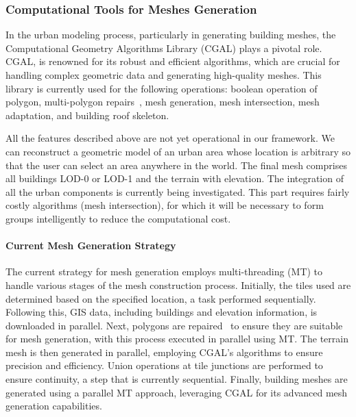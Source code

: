 \documentclass[runningheads]{llncs}
\begin{document}
\subsubsection{Computational Tools for Meshes Generation}

In the urban modeling process, particularly in generating building meshes, the Computational Geometry Algorithms Library (CGAL) plays a pivotal role. CGAL, \cite{the_cgal_project_cgal_2024} is renowned for its robust and efficient algorithms, which are crucial for handling complex geometric data and generating high-quality meshes. This library is currently used for the following operations: boolean operation of polygon, multi-polygon repairs~\cite{loriot_polygon_2024}, mesh generation, mesh intersection, mesh adaptation, and building roof skeleton.

All the features described above are not yet operational in our framework. We can reconstruct a geometric model of an urban area whose location is arbitrary so that the user can select an area anywhere in the world. The final mesh comprises all buildings LOD-0 or LOD-1 and the terrain with elevation. The integration of all the urban components is currently being investigated. This part requires fairly costly algorithms (mesh intersection), for which it will be necessary to form groups intelligently to reduce the computational cost.

\paragraph{Current Mesh Generation Strategy}
The current strategy for mesh generation employs multi-threading (MT) to handle various stages of the mesh construction process. Initially, the tiles used are determined based on the specified location, a task performed sequentially. Following this, GIS data, including buildings and elevation information, is downloaded in parallel. Next, polygons are repaired~\cite{loriot_polygon_2024} to ensure they are suitable for mesh generation, with this process executed in parallel using MT. The terrain mesh is then generated in parallel, employing CGAL's algorithms to ensure precision and efficiency. Union operations at tile junctions are performed to ensure continuity, a step that is currently sequential. Finally, building meshes are generated using a parallel MT approach, leveraging CGAL for its advanced mesh generation capabilities.
\end{document}
